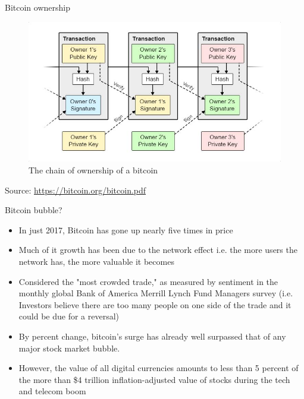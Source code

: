 \documentclass[9pt]{beamer}
\begin{document}
\begin{frame}{Bitcoin ownership}
	\begin{figure}[]
		\centering
		\includegraphics  [scale=0.5]{Images/ownership}
		\caption{The chain of ownership of a bitcoin}
	\end{figure}
	\begin{tiny}
		Source: \href{https://bitcoin.org/bitcoin.pdf}{https://bitcoin.org/bitcoin.pdf}
	\end{tiny}
\end{frame}


\begin{frame}{Bitcoin bubble?}
	\begin{itemize}
		\item In just 2017, Bitcoin has gone up nearly five times in price
		\item Much of it growth has been due to the network effect i.e. the more users the network has, the more valuable it becomes
		\item Considered the "most crowded trade," as measured by sentiment in the monthly global Bank of America Merrill Lynch Fund Managers survey (i.e. Investors believe there are too many people on one side of the trade and it could be due for a reversal)
		\item By percent change, bitcoin's surge has already well surpassed that of any major stock market bubble.
		\item However, the value of all digital currencies amounts to less than 5 percent of the more than \$4 trillion inflation-adjusted value of stocks during the tech and telecom boom
	\end{itemize}
\end{frame}
\end{document}
